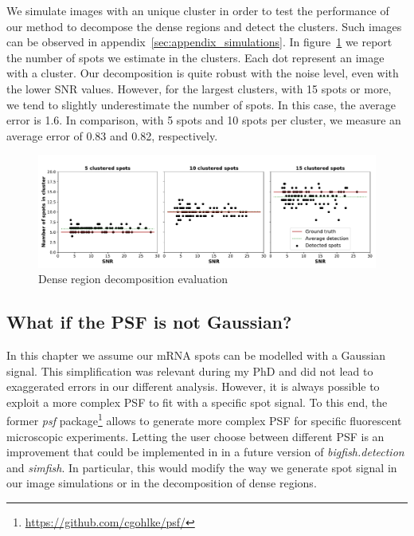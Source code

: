 We simulate images with an unique cluster in order to test the performance of our method to decompose the dense regions and detect the clusters.
Such images can be observed in appendix~\ref{sec:appendix_simulations}.
In figure~\ref{fig:cluster_results} we report the number of spots we estimate in the clusters.
Each dot represent an image with a cluster.
Our decomposition is quite robust with the noise level, even with the lower \ac{SNR} values.
However, for the largest clusters, with 15 spots or more, we tend to slightly underestimate the number of spots.
In this case, the average error is 1.6.
In comparison, with 5 spots and 10 spots per cluster, we measure an average error of 0.83 and 0.82, respectively.

\begin{figure}[h]
    \centering
    \includegraphics[width=1\textwidth]{figures/chapter2/cluster_along_noise}
    \caption{Dense region decomposition evaluation}
    \label{fig:cluster_results}
\end{figure}

\subsection{What if the \ac{PSF} is not Gaussian?} \label{subsec:psf}

In this chapter we assume our \ac{mRNA} spots can be modelled with a Gaussian signal.
This simplification was relevant during my PhD and did not lead to exaggerated errors in our different analysis.
However, it is always possible to exploit a more complex \ac{PSF} to fit with a specific spot signal.
To this end, the former \emph{psf} package\footnote{\url{https://github.com/cgohlke/psf/}} allows to generate more complex \ac{PSF} for specific fluorescent microscopic experiments.
Letting the user choose between different \ac{PSF} is an improvement that could be implemented in in a future version of \emph{bigfish.detection} and \emph{simfish}.
In particular, this would modify the way we generate spot signal in our image simulations or in the decomposition of dense regions.

